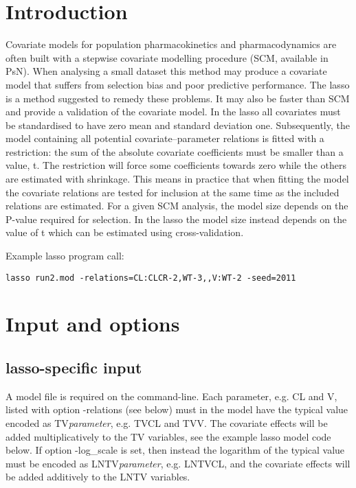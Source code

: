 




\maketitle
\newcommand{\guidetoolname}{lasso}


\section{Introduction}
Covariate models for population pharmacokinetics and pharmacodynamics are often built with a stepwise covariate modelling procedure (SCM, available in PsN). When analysing a small dataset this method may produce a covariate model that suffers from selection bias and poor predictive performance. The lasso \cite{Ribbing} is a method suggested to remedy these problems. It may also be faster than SCM and provide a validation of the covariate model. In the lasso all covariates must be standardised to have zero mean and standard deviation one. Subsequently, the model containing all potential covariate–parameter relations is fitted with a restriction: the sum of the absolute covariate coefficients must be smaller than a value, t. The restriction will force some coefficients towards zero while the others are estimated with shrinkage. This means in practice that when fitting the model the covariate relations are tested for inclusion at the same time as the included relations are estimated. For a given SCM analysis, the model size depends on the P-value required for selection. In the lasso the model size instead depends on the value of t which can be estimated using cross-validation.

Example lasso program call:
\begin{verbatim}
lasso run2.mod -relations=CL:CLCR-2,WT-3,,V:WT-2 -seed=2011
\end{verbatim}

\section{Input and options}

\subsection{lasso-specific input}
A model file is required on the command-line. Each parameter, e.g. CL and V, listed with option
-relations (see below) must in the model have the typical value encoded as TV\emph{parameter}, e.g. TVCL and TVV.
The covariate effects will be added multiplicatively to the TV variables, see the example lasso model code 
below. If option -log\_scale is set, then instead the logarithm of the typical value must be encoded as
LNTV\emph{parameter}, e.g. LNTVCL, and the covariate effects will be added additively to the LNTV variables.

